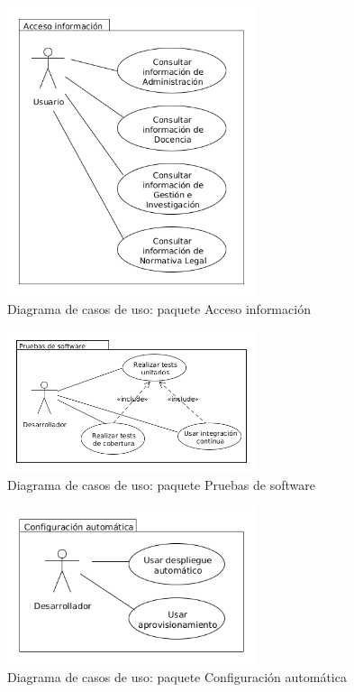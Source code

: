\begin{figure}[!ht]
  \begin{center}
  \includegraphics[width=0.65\textwidth]{imagenes/diag_cu_ai.png}
  \caption{Diagrama de casos de uso: paquete Acceso información}
  \label{fig:diag_cu_ai}
  \end{center}
\end{figure}

\begin{figure}[!ht]
  \begin{center}
  \includegraphics[width=0.65\textwidth]{imagenes/diag_cu_ps.png}
  \caption{Diagrama de casos de uso: paquete Pruebas de software}
  \label{fig:diag_cu_ps}
  \end{center}
\end{figure}

\begin{figure}[!ht]
  \begin{center}
  \includegraphics[width=0.65\textwidth]{imagenes/diag_cu_ca.png}
  \caption{Diagrama de casos de uso: paquete Configuración automática}
  \label{fig:diag_cu_ca}
  \end{center}
\end{figure}

